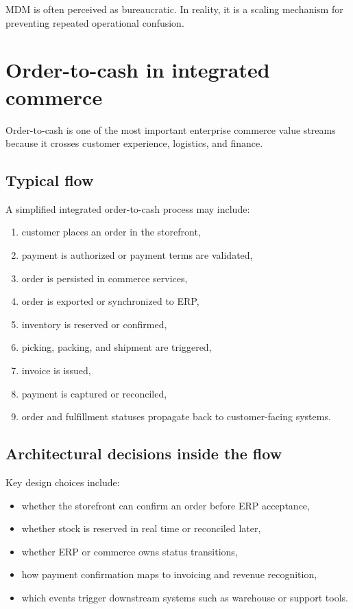 MDM is often perceived as bureaucratic.
In reality, it is a scaling mechanism for preventing repeated operational confusion.

\section{Order-to-cash in integrated commerce}
Order-to-cash is one of the most important enterprise commerce value streams because it crosses customer experience, logistics, and finance.

\subsection{Typical flow}
A simplified integrated order-to-cash process may include:
\begin{enumerate}
  \item customer places an order in the storefront,
  \item payment is authorized or payment terms are validated,
  \item order is persisted in commerce services,
  \item order is exported or synchronized to ERP,
  \item inventory is reserved or confirmed,
  \item picking, packing, and shipment are triggered,
  \item invoice is issued,
  \item payment is captured or reconciled,
  \item order and fulfillment statuses propagate back to customer-facing systems.
\end{enumerate}

\subsection{Architectural decisions inside the flow}
Key design choices include:
\begin{itemize}
  \item whether the storefront can confirm an order before ERP acceptance,
  \item whether stock is reserved in real time or reconciled later,
  \item whether ERP or commerce owns status transitions,
  \item how payment confirmation maps to invoicing and revenue recognition,
  \item which events trigger downstream systems such as warehouse or support tools.
\end{itemize}

